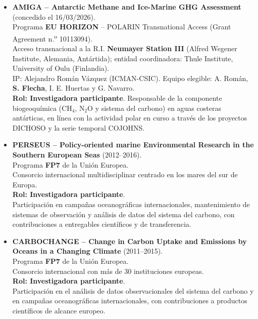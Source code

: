 \documentclass[11pt,a4paper]{article}
\begin{document}
\begin{itemize}[leftmargin=*]

    \item \textbf{AMIGA -- Antarctic Methane and Ice-Marine GHG Assessment} (concedido el 16/03/2026).\\
    Programa \textbf{EU HORIZON} -- POLARIN Transnational Access (Grant Agreement n.\textsuperscript{o} 10113094).\\
    Acceso transnacional a la R.I. \textbf{Neumayer Station III} (Alfred Wegener Institute, Alemania, Antártida); entidad coordinadora: Thule Institute, University of Oulu (Finlandia).\\
    IP: Alejandro Román Vázquez (ICMAN-CSIC). Equipo elegible: A. Román, \textbf{S. Flecha}, I. E. Huertas y G. Navarro.\\
    \textbf{Rol: Investigadora participante}. Responsable de la componente biogeoquímica (CH$_4$, N$_2$O y sistema del carbono) en aguas costeras antárticas, en línea con la actividad polar en curso a través de los proyectos DICHOSO y la serie temporal COJOHNS.

    \item \textbf{PERSEUS -- Policy-oriented marine Environmental Research in the Southern European Seas} (2012--2016).\\
    Programa \textbf{FP7} de la Unión Europea.\\
    Consorcio internacional multidisciplinar centrado en los mares del sur de Europa.\\
    \textbf{Rol: Investigadora participante}.\\
    Participación en campañas oceanográficas internacionales, mantenimiento de sistemas de observación y análisis de datos del sistema del carbono, con contribuciones a entregables científicos y de transferencia.

    \item \textbf{CARBOCHANGE -- Change in Carbon Uptake and Emissions by Oceans in a Changing Climate} (2011--2015).\\
    Programa \textbf{FP7} de la Unión Europea.\\
    Consorcio internacional con más de 30 instituciones europeas.\\
    \textbf{Rol: Investigadora participante}.\\
    Participación en el análisis de datos observacionales del sistema del carbono y en campañas oceanográficas internacionales, con contribuciones a productos científicos de alcance europeo.


\end{itemize}
\end{document}
